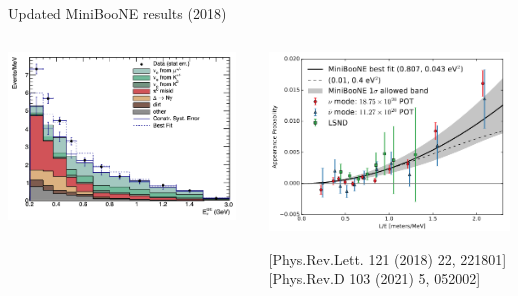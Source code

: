 \begin{frame}[t]{Updated MiniBooNE results (2018)}

  \begin{columns}[T]
    \begin{column}{0.55\textwidth}
      \includegraphics[width=0.95\textwidth]{./images/beyond3nu/accelerator/miniboone_new_excess}
    \end{column}
    \begin{column}{0.45\textwidth}
      \includegraphics[width=0.99\textwidth]{./images/beyond3nu/accelerator/miniboone_new_app_prob}
      \vspace{-0.2cm}
      \begin{center}
      {\scriptsize \color{blue}[Phys.Rev.Lett. 121 (2018) 22, 221801]}\\
      {\scriptsize \color{blue}[Phys.Rev.D 103 (2021) 5, 052002]}\\
      \end{center}
    \end{column}
  \end{columns}


\end{frame}
